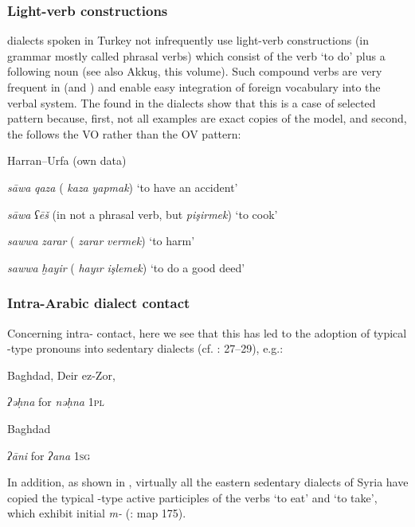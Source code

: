 \documentclass[output=paper]{langsci/langscibook}
\begin{document}
\subsubsection{Light-verb constructions}
 dialects spoken in Turkey not infrequently use light-verb constructions (in  grammar mostly called phrasal verbs) which consist of the verb ‘to do’ plus a following noun (see also Akkuş, this volume). Such compound verbs are very frequent in  (and ) and enable easy integration of foreign vocabulary into the verbal system. The  found in the  dialects show that this  is a case of selected pattern  because, first, not all examples are exact copies of the  model, and second, the  follows the  VO rather than the  OV pattern:

\ea
Harran--Urfa (own data)

\textit{sāwa} \textit{qaza} ( \textit{kaza} \textit{yapmak}) ‘to have an accident’

\textit{sāwa} \textit{ʕēš} (in  not a phrasal verb, but \textit{pişirmek}) ‘to cook’
\z

\ea
{}  \citep[198]{Procházka2002Cukurova} 

\textit{sawwa} \textit{zarar} ( \textit{zarar} \textit{vermek}) ‘to harm’

\textit{sawwa} \textit{ḫayir} ( \textit{hayır} \textit{işlemek}) ‘to do a good deed’
\z

\subsubsection{Intra-Arabic dialect contact}
Concerning intra- contact, here we see that this has led to the adoption of typical -type pronouns into sedentary dialects (cf. \citealt{Palva2009}: 27--29), e.g.:

\ea
Baghdad, Deir ez-Zor,  

\textit{ʔəḥna} for \textit{nəḥna} \textsc{1pl}
\z

\ea
Baghdad 

\textit{ʔāni} for \textit{ʔana} \textsc{1sg}
\z

In addition, as shown in , virtually all the eastern sedentary dialects of Syria have copied the typical -type active participles of the verbs ‘to eat’ and ‘to take’, which exhibit initial \textit{m-} (\citealt{Behnstedt1997}: map 175).
\end{document}
